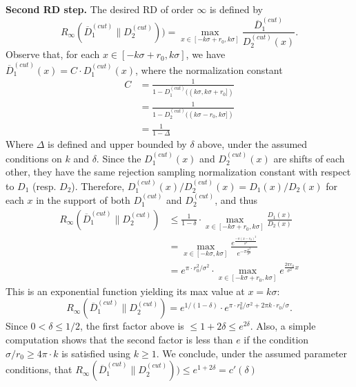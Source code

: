 \textbf{Second RD step.} The desired RD of order $\infty$ is defined by
\[
  R_\infty(\overline{D}_1^{(cut)}\|D_2^{(cut)})) = \max_{x \in
    [-k\sigma+r_0,k\sigma]} \frac{\overline{D}_1^{(cut)}} {D_2^{(cut)}(x)}.
\]
Observe that, for each $x \in [-k\sigma+r_0,k\sigma]$, we have
$\overline{D}_1^{(cut)}(x) = C \cdot D_1^{(cut)}(x)$, where the normalization
constant
\begin{align*}
  C &= \frac{1}{1-D_1^{(cut)}((k\sigma,k\sigma+r_0])}\\
    &= \frac{1}{1-D_2^{(cut)}((k\sigma-r_0,k\sigma])}\\
    &= \frac{1}{1-\Delta}
\end{align*}
Where $\Delta$ is defined and upper bounded by $\delta$ above, under the assumed
conditions on $k$ and $\delta$. Since the $D_1^{(cut)}(x)$ and $D_2^{(cut)}(x)$
are shifts of each other, they have the same rejection sampling normalization
constant with respect to $D_1$ (resp. $D_2$). Therefore,
$D_1^{(cut)}(x)/D_2^{(cut)}(x)=D_1(x)/D_2(x)$ for each $x$ in the support of
both $D_1^{(cut)}$ and $D_2^{(cut)}$, and thus
\begin{align*}
  R_\infty(\overline{D}_1^{(cut)}\|D_2^{(cut)}) &\leq \frac{1}{1-\delta} \cdot \max_{x \in [-k\sigma+r_0,k\sigma]} \frac{D_1(x)}
                                                  {D_2(x)}\\
                                                &= \max_{x \in [-k\sigma,k\sigma]}\frac{e^{\frac{-\pi(x-r_0)^2}{\sigma^2}}}{e^{-\pi\frac{x^2}{\sigma^2}}}
  \\
                                                &= e^{\pi \cdot r_0^2/\sigma^2} \cdot \max_{x \in [-k\sigma+r_0,k\sigma]}e^{\frac{2\pi r_0}
                                                  {\sigma^2}x}
\end{align*}
This is an exponential function yielding its max value at $x = k\sigma$:
$$
R_\infty(\overline{D}_1^{(cut)}\|D_2^{(cut)}) = e^{1/(1-\delta)} \cdot e^{\pi
  \cdot r_0^2/\sigma^2 + 2\pi k \cdot r_0/\sigma}.
$$
Since $0<\delta \leq 1/2$, the first factor above is
$\leq 1+2\delta \leq e^{2\delta}$. Also, a simple computation shows that the
second factor is less than $e$ if the condition $\sigma/r_0 \geq 4 \pi \cdot k$ is
satisfied using $k \geq 1$. We conclude, under the assumed parameter conditions,
that
$R_\infty(\overline{D}_1^{(cut)}\|D_2^{(cut)})) \leq e^{1+2\delta} = c'(\delta)$
